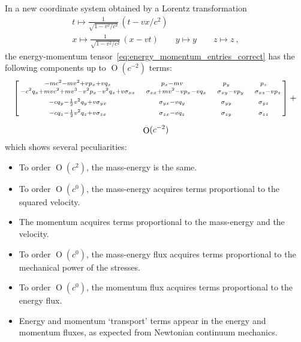 \documentclass[\ifafour a4paper,12pt,\else a5paper,10pt,\fi%
onecolumn,oneside,article,%
british%
]{memoir}
\DeclareMathOperator{\Ord}{O}%
\renewcommand*{\|}[1][]{\nonscript\:#1\vert\nonscript\:\mathopen{}}
\begin{document}
In a new coordinate system obtained by a Lorentz transformation
\begin{equation}
  \label{eq:lorentz_transf}
  \begin{gathered}
    t \mapsto \tfrac{1}{\sqrt{1-v^{2}/c^{2}}}\, (t - v x/c^{2})
    \\
    x \mapsto \tfrac{1}{\sqrt{1-v^{2}/c^{2}}}\, (x - v t)
    \qquad y \mapsto y \qquad z \mapsto z \ ,
  \end{gathered}
\end{equation}
the energy-momentum tensor~\eqref{eq:energy_momentum_entries_correct} has the following components up to $\Ord(c^{-2})$ terms:
\begin{multline}
  \label{eq:energy_momentum_boost}
    \left[\begin{smallmatrix}
        -m c^{2} - m v^{2} + v p_{x} + v q_{x}
        & p_{x} - m v & p_{y} & p_{z}
    \\
    -c^{2} q_{x} + m v c^{2} + m v^{3}- v^{2} p_{x} - v^{2} q_{x} + v \sigma_{xx}
    &\quad
    \sigma_{xx} + m v^{2} - v p_{x} - v q_{x}
    &\quad \sigma_{xy} - v p_{y}
    &\quad \sigma_{xz} - v p_{z}
    \\[\jot]
    -c q_{y} - \frac12 v^{2} q_{y} + v \sigma_{yx}
    & \sigma_{yx} - v q_{y}
    & \sigma_{yy} & \sigma_{yz}
    \\[\jot]
    -c q_{z} - \frac12 v^{2} q_{z} + v \sigma_{zx}
    & \sigma_{zx} - v q_{z}
    & \sigma_{zy} & \sigma_{zz}
  \end{smallmatrix}\right]
+{}\\[2\jot] \Ord(c^{-2})
\end{multline}
which shows several peculiarities:
\begin{itemize}[noitemsep]
\item To order $\Ord(c^{2})$, the mass-energy is the same.
\item To order $\Ord(c^{0})$, the mass-energy acquires terms proportional to the squared velocity.
\item The momentum acquires terms proportional to the mass-energy and the velocity.
\item To order $\Ord(c^{0})$, the mass-energy flux acquires terms proportional to the mechanical power of the stresses.
\item To order $\Ord(c^{0})$, the momentum flux acquires terms proportional to the energy flux.
\item Energy and momentum \enquote*{transport} terms appear in the energy and momentum fluxes, as expected from Newtonian continuum mechanics.
\end{itemize}
\end{document}
